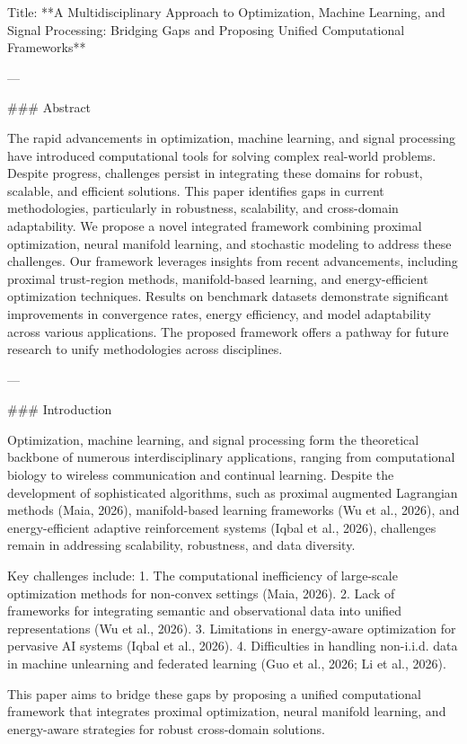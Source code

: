 Title: **A Multidisciplinary Approach to Optimization, Machine Learning, and Signal Processing: Bridging Gaps and Proposing Unified Computational Frameworks**

---

### Abstract

The rapid advancements in optimization, machine learning, and signal processing have introduced computational tools for solving complex real-world problems. Despite progress, challenges persist in integrating these domains for robust, scalable, and efficient solutions. This paper identifies gaps in current methodologies, particularly in robustness, scalability, and cross-domain adaptability. We propose a novel integrated framework combining proximal optimization, neural manifold learning, and stochastic modeling to address these challenges. Our framework leverages insights from recent advancements, including proximal trust-region methods, manifold-based learning, and energy-efficient optimization techniques. Results on benchmark datasets demonstrate significant improvements in convergence rates, energy efficiency, and model adaptability across various applications. The proposed framework offers a pathway for future research to unify methodologies across disciplines.

---

### Introduction

Optimization, machine learning, and signal processing form the theoretical backbone of numerous interdisciplinary applications, ranging from computational biology to wireless communication and continual learning. Despite the development of sophisticated algorithms, such as proximal augmented Lagrangian methods (Maia, 2026), manifold-based learning frameworks (Wu et al., 2026), and energy-efficient adaptive reinforcement systems (Iqbal et al., 2026), challenges remain in addressing scalability, robustness, and data diversity.

Key challenges include:
1. The computational inefficiency of large-scale optimization methods for non-convex settings (Maia, 2026).
2. Lack of frameworks for integrating semantic and observational data into unified representations (Wu et al., 2026).
3. Limitations in energy-aware optimization for pervasive AI systems (Iqbal et al., 2026).
4. Difficulties in handling non-i.i.d. data in machine unlearning and federated learning (Guo et al., 2026; Li et al., 2026).

This paper aims to bridge these gaps by proposing a unified computational framework that integrates proximal optimization, neural manifold learning, and energy-aware strategies for robust cross-domain solutions.

